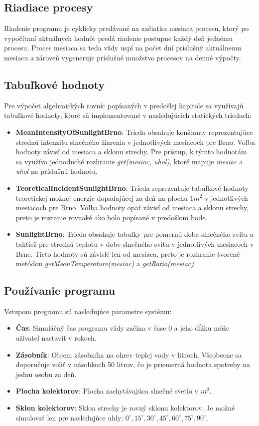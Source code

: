 \documentclass[a4paper, 11pt]{article}
\begin{document}
\subsection{Riadiace procesy}\label{solar_energy_proces}
Riadenie programu je cyklicky predávané na začiatku mesiaca procesu, ktorý po vypočítaní aktuálnych hodnôt predá riadenie postupne každý deň jednému procesu. Proces mesiaca sa teda vždy uspí na počet dní príslušný aktuálnemu mesiacu a zároveň vygeneruje príslušné množstvo procesov na denné výpočty.

\subsection{Tabuľkové hodnoty}
Pre výpočet algebraických rovníc popísaných v predošlej kapitole sa využívajú tabuľkové hodnoty, ktoré sú implementované v nasledujúcich statických triedach:
\begin{itemize}
	\item \textbf{MeanIntensityOfSunlightBrno}: Trieda obsahuje konštanty reprezentujúce strednú intenzitu slnečného žiarenia v jednotlivých mesiacoch pre Brno. Voľba hodnoty závisí od mesiaca a sklonu strechy. Pre prístup, k týmto hodnotám sa využíva jednoduché rozhranie \textit{get(mesiac, uhol)}, ktoré mapuje \textit{mesiac} a \textit{uhol} na príslušnú hodnotu.
	\item \textbf{TeoreticalIncidentSunlightBrno}: Trieda reprezentuje tabuľkové hodnoty teoretickej možnej energie do\-pa\-da\-jú\-cej za deň na plochu $1m^{2}$ v jednotlivých mesiacoch pre Brno. Voľba hodnoty opäť závisí od mesiaca a sklonu strechy, preto je rozranie rovnaké ako bolo popísané v predošlom bode.
	\item \textbf{SunlightBrno}: Trieda obsahuje tabuľky pre pomernú doba slnečného svitu a taktiež pre strednú teplotu v dobe slnečného svitu v jednotlivých mesiacoch v Brne. Tieto hodnoty sú závislé len od mesiaca, preto je rozhranie tvorené metódou \textit{getMeanTemperature(mesiac)} a \textit{getRatio(mesiac)}.
\end{itemize}

\subsection{Používanie programu}
Vstupom programu sú nasledujúce parametre systému:
\begin{itemize}
	\item \textbf{Čas}: Simuláčný čas programu vždy začína v čase 0 a jeho dĺžku môže uživateľ nastaviť v rokoch.
	\item \textbf{Zásobník}: Objem zásobníka na ohrev teplej vody v litroch. Všeobecne sa doporučuje voliť v násobkoch 50 litrov, čo je priemerná hodnota spotreby na jednu osobu za deň.
	\item \textbf{Plocha kolektorov}: Plocha zachytávajúca slnečné svetlo v $m^2$.
	\item \textbf{Sklon kolektorov}: Sklon strechy je rovný sklonu kolektorov. Je možné simulovať len pre nasledujúce uhly: $0^{\circ}, 15^{\circ}, 30^{\circ}, 45^{\circ}, 60^{\circ}, 75^{\circ}, 90^{\circ}$.
\end{itemize}
\end{document}
